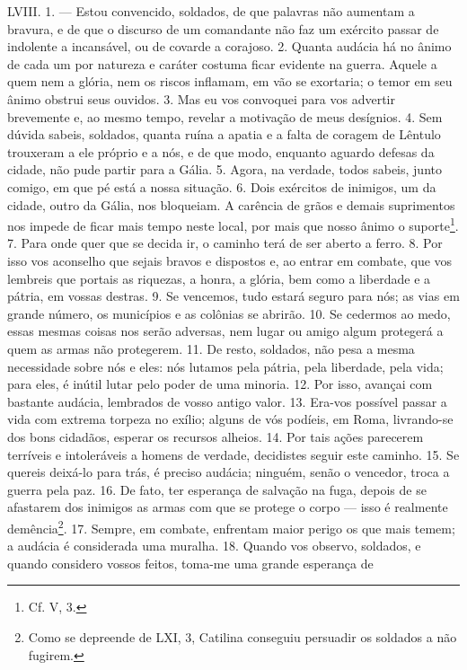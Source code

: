 LVIII. 1. --- Estou convencido, soldados, de que palavras não aumentam a
bravura, e de que o discurso de um comandante não faz um exército passar de
indolente a incansável, ou de covarde a corajoso. 2. Quanta audácia há no ânimo
de cada um por natureza e caráter costuma ficar evidente na guerra. Aquele a
quem nem a glória, nem os riscos inflamam, em vão se exortaria; o temor em seu
ânimo obstrui seus ouvidos. 3. Mas eu vos convoquei para vos advertir
brevemente e, ao mesmo tempo, revelar a motivação de meus desígnios. 4. Sem
dúvida sabeis, soldados, quanta ruína a apatia e a falta de coragem de Lêntulo
trouxeram a ele próprio e a nós, e de que modo, enquanto aguardo defesas da
cidade, não pude partir para a Gália. 5. Agora, na verdade, todos sabeis, junto
comigo, em que pé está a nossa situação. 6. Dois exércitos de inimigos, um da
cidade, outro da Gália, nos bloqueiam. A carência de grãos e demais suprimentos
nos impede de ficar mais tempo neste local, por mais que nosso ânimo o
suporte\footnote{Cf. V, 3.}. 7. Para onde quer que se decida ir, o caminho terá
de ser aberto a ferro. 8. Por isso vos aconselho que sejais bravos e dispostos
e, ao entrar em combate, que vos lembreis que portais as riquezas, a honra, a
glória, bem como a liberdade e a pátria, em vossas destras. 9. Se vencemos,
tudo estará seguro para nós; as vias em grande número, os municípios e as
colônias se abrirão. 10. Se cedermos ao medo, essas mesmas coisas nos serão
adversas, nem lugar ou amigo algum protegerá a quem as armas não protegerem.
11. De resto, soldados, não pesa a mesma necessidade sobre nós e eles: nós
lutamos pela pátria, pela liberdade, pela vida; para eles, é inútil lutar pelo
poder de uma minoria. 12. Por isso, avançai com bastante audácia, lembrados de
vosso antigo valor. 13. Era-vos possível passar a vida com extrema torpeza no
exílio; alguns de vós podíeis, em Roma, livrando-se dos bons cidadãos, esperar
os recursos alheios. 14. Por tais ações parecerem terríveis e intoleráveis a
homens de verdade, decidistes seguir este caminho. 15. Se quereis deixá-lo para
trás, é preciso audácia; ninguém, senão o vencedor, troca a guerra pela paz.
16. De fato, ter esperança de salvação na fuga, depois de se afastarem dos
inimigos as armas com que se protege o corpo --- isso é realmente
demência\footnote{Como se depreende de LXI, 3, Catilina conseguiu persuadir os
soldados a não fugirem.}. 17. Sempre, em combate, enfrentam maior perigo os que
mais temem; a audácia é considerada uma muralha. 18. Quando vos observo,
soldados, e quando considero vossos feitos, toma-me uma grande esperança de
